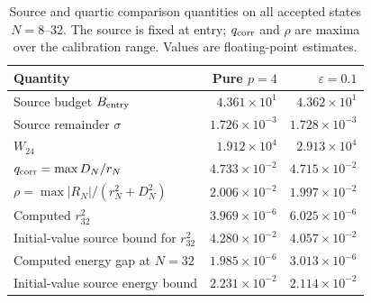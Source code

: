 \begin{table}[!htbp]
\centering
\small
\caption{Source and quartic comparison quantities on all accepted states \(N=8\)--32. The source is fixed at entry; \(q_{\rm corr}\) and \(\rho\) are maxima over the calibration range. Values are floating-point estimates.}
\label{tab:merged-trajectory-conditions}
\begin{tabularx}{\linewidth}{@{}Xrr@{}}
\toprule
Quantity & Pure \(p=4\) & \(\varepsilon=0.1\) \\
\midrule
Source budget \(B_{\rm entry}\) & \(4.361\times10^{1}\) & \(4.362\times10^{1}\) \\
Source remainder \(\sigma\) & \(1.726\times10^{-3}\) & \(1.728\times10^{-3}\) \\
\(W_{24}\) & \(1.912\times10^{4}\) & \(2.913\times10^{4}\) \\
\(q_{\rm corr}=\max D_N/r_N\) & \(4.733\times10^{-2}\) & \(4.715\times10^{-2}\) \\
\(\rho=\max |R_N|/(r_N^2+D_N^2)\) & \(2.006\times10^{-2}\) & \(1.997\times10^{-2}\) \\
Computed \(r_{32}^2\) & \(3.969\times10^{-6}\) & \(6.025\times10^{-6}\) \\
Initial-value source bound for \(r_{32}^2\) & \(4.280\times10^{-2}\) & \(4.057\times10^{-2}\) \\
Computed energy gap at \(N=32\) & \(1.985\times10^{-6}\) & \(3.013\times10^{-6}\) \\
Initial-value source energy bound & \(2.231\times10^{-2}\) & \(2.114\times10^{-2}\) \\
\bottomrule
\end{tabularx}
\end{table}
